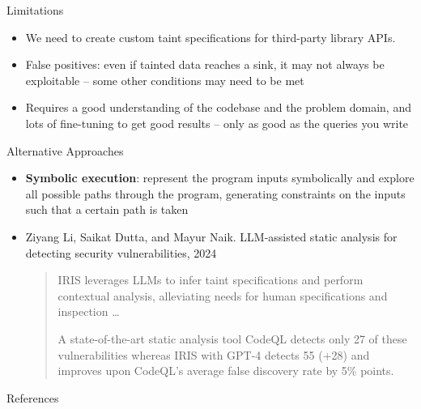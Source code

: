 \documentclass[aspectratio=169,xcolor=dvipsnames]{beamer}
\begin{document}
\begin{frame}{Limitations}

	\begin{itemize}
		\item We need to create custom taint specifications for third-party library APIs.
		\item False positives: even if tainted data reaches a sink, it may not always be
		      exploitable -- some other conditions may need to be met
		\item Requires a good understanding of the codebase and the problem domain, and lots
		      of fine-tuning to get good results -- only as good as the queries you write
	\end{itemize}
\end{frame}

\begin{frame}{Alternative Approaches}

	\begin{itemize}
		\item {\bf Symbolic execution}: represent the program inputs symbolically and explore all
		      possible paths through the program, generating constraints on the inputs such
		      that a certain path is taken
		\item Ziyang Li, Saikat Dutta, and Mayur Naik. LLM-assisted static analysis for
		      detecting security vulnerabilities, 2024 \bigskip

		      \begin{quote}
			      IRIS leverages LLMs to infer taint specifications and perform contextual analysis, alleviating needs for human specifications and inspection \dots

			      A state-of-the-art static analysis tool CodeQL detects only 27 of these
			      vulnerabilities whereas IRIS with GPT-4 detects 55 (+28) and improves upon
			      CodeQL's average false discovery rate by 5\% points.
		      \end{quote}
	\end{itemize}
\end{frame}


\begin{frame}{References}
	\nocite{*}
	
\end{frame}
\end{document}
